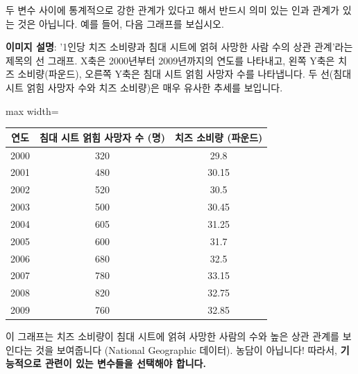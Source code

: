 \documentclass[11pt,a4paper]{book}
\theoremstyle{definition}
\begin{document}
\begin{tcolorbox}[warningbox, title={가짜 상관 관계 (Spurious Relationships)}]
두 변수 사이에 통계적으로 강한 관계가 있다고 해서 반드시 의미 있는 인과 관계가 있는 것은 아닙니다. 예를 들어, 다음 그래프를 보십시오.

\begin{center}
\end{center}
\textbf{이미지 설명}: '1인당 치즈 소비량과 침대 시트에 얽혀 사망한 사람 수의 상관 관계'라는 제목의 선 그래프. X축은 2000년부터 2009년까지의 연도를 나타내고, 왼쪽 Y축은 치즈 소비량(파운드), 오른쪽 Y축은 침대 시트 얽힘 사망자 수를 나타냅니다. 두 선(침대 시트 얽힘 사망자 수와 치즈 소비량)은 매우 유사한 추세를 보입니다.

\begin{adjustbox}{max width=\textwidth}
\begin{tabular}{ccc}
\toprule
\textbf{연도} & \textbf{침대 시트 얽힘 사망자 수 (명)} & \textbf{치즈 소비량 (파운드)} \\
\midrule
2000 & 320 & 29.8 \\
2001 & 480 & 30.15 \\
2002 & 520 & 30.5 \\
2003 & 500 & 30.45 \\
2004 & 605 & 31.25 \\
2005 & 600 & 31.7 \\
2006 & 680 & 32.5 \\
2007 & 780 & 33.15 \\
2008 & 820 & 32.75 \\
2009 & 760 & 32.85 \\
\bottomrule
\end{tabular}
\end{adjustbox}
이 그래프는 치즈 소비량이 침대 시트에 얽혀 사망한 사람의 수와 높은 상관 관계를 보인다는 것을 보여줍니다 (National Geographic 데이터). 농담이 아닙니다! 따라서, \textbf{기능적으로 관련이 있는 변수들을 선택해야 합니다.}
\end{tcolorbox}
\end{document}
